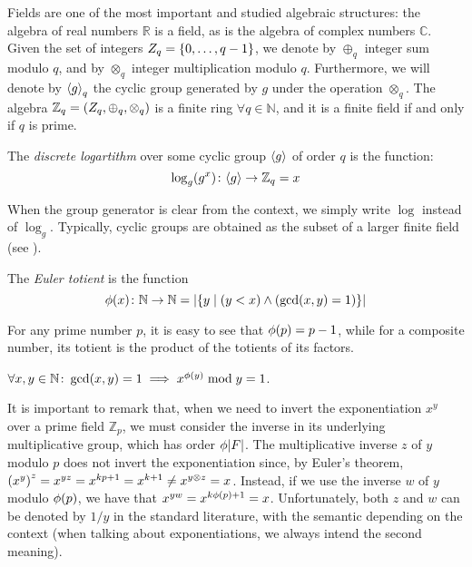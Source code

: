 Fields are one of the most important and studied algebraic structures: the algebra of real numbers 
\(\mathbb{R}\) is a field, as is the algebra of complex numbers \(\mathbb{C}\).
Given the set of integers \(Z_q = \Set{0, \dots, q-1}\), we denote by \(\oplus_q\) integer sum 
modulo \(q\), and by \(\otimes_q\) integer multiplication modulo \(q\).
Furthermore, we will denote by \(\gengroup{g}_q\) the cyclic group generated by \(g\) under 
the operation \(\otimes_q\).
The algebra \(\mathbb{Z}_q = \Tuple{Z_q, \oplus_q, \otimes_q}\) is a finite ring 
\(\forall q \in \mathbb{N}\), and it is a finite field if and only if \(q\) is prime.
\begin{definition}
  The \emph{discrete logartithm} over some cyclic group \(\gengroup{g}\) of order \(q\) is the 
  function:
  \[\call{\log_g}{g^x}\colon \gengroup{g} \to \mathbb{Z}_q = x\]
\end{definition}

When the group generator is clear from the context, we simply write \(\log \) instead of \(\log_g\).
Typically, cyclic groups are obtained as the subset of a larger finite field 
(see ). 

\begin{definition}
  The \emph{Euler totient} is the function 
  \[\call{\totient}{x}\colon \mathbb{N} \to \mathbb{N} = \abs{\Set{y \mid \Parens*{y < x} \land \Parens*{\call{\gcd}{x, y} = 1}}}\]
\end{definition}

For any prime number \(p\), it is easy to see that \(\call{\totient}{p} = p - 1\), while for 
a composite number, its totient is the product of the totients of its factors.

\begin{theorem}
  \(\forall x,y \in \mathbb{N}\colon \call{\gcd}{x, y} = 1 \implies x^{\call{\totient}{y}} \bmod y = 1\).
\end{theorem}

It is important to remark that, when we need to invert the exponentiation \(x^y\) over a prime 
field \(\mathbb{Z}_p\), we must consider the inverse in its underlying multiplicative group, which 
has order \(\totient{\abs{F}}\). 
The multiplicative inverse \(z\) of \(y\) modulo \(p\) does not invert the exponentiation since, 
by Euler's theorem, \(\Parens*{x^{y}}^{z} = x^{yz} = x^{kp + 1} = x^{k + 1} \neq x^{y \otimes z} = x\).
Instead, if we use the inverse \(w\) of \(y\) modulo \(\call{\totient}{p}\), we have that 
\(x^{yw} = x^{k\call{\totient}{p} + 1} = x\).
Unfortunately, both \(z\) and \(w\) can be denoted by \(1/y\) in the standard literature, with the 
semantic depending on the context (when talking about exponentiations, we always intend the 
second meaning).

